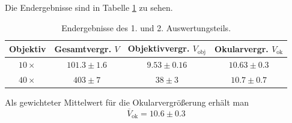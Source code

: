 \documentclass[12pt,a4paper,titlepage,headinclude]{scrartcl}
\numberwithin{equation}{subsection}
\begin{document}
Die Endergebnisse sind in Tabelle \ref{tab:erg1} zu sehen.
\begin{table}[H]
	\centering
	\begin{tabular}{|c|c|c|c|}
		\hline
		Objektiv&Gesamtvergr. $V$&Objektivvergr. $V_\text{obj}$&Okularvergr. $V_\text{ok}$\\\hline
		$10\times$&$101.3\pm1.6$&$9.53\pm0.16$&$10.63\pm0.3$\\\hline
		$40\times$&$403\pm7$&$38\pm3$&$10.7\pm0.7$\\\hline
	\end{tabular}
	\caption{Endergebnisse des 1. und 2. Auswertungsteils.}
	\label{tab:erg1}
\end{table}
Als gewichteter Mittelwert für die Okularvergrößerung erhält man
	\begin{equation}
		\overline{V}_\text{ok}=10.6\pm0.3
		\label{eq:mittelok}
	\end{equation}
\end{document}
